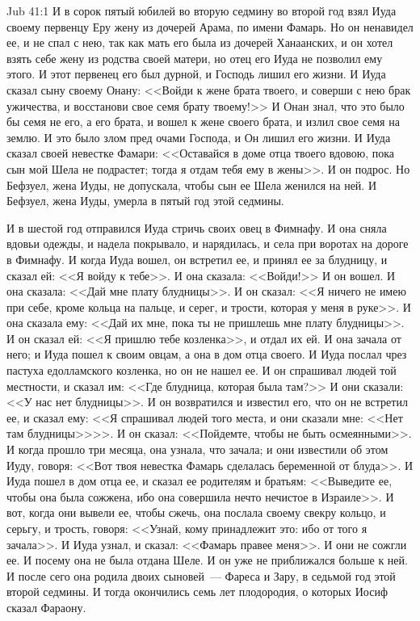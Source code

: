 \vs Jub 41:1
И в сорок пятый юбилей во вторую седмину во
второй год взял Иуда своему первенцу Еру жену из
дочерей Арама, по имени Фамарь. Но он ненавидел
ее, и не спал с нею, так как мать его была из
дочерей Ханаанских, и он хотел взять себе жену из
родства своей матери, но отец его Иуда не
позволил ему этого. И этот первенец его был
дурной, и Господь лишил его жизни. И Иуда сказал
сыну своему Онану: <<Войди к жене брата твоего, и
соверши с нею брак ужичества, и восстанови свое
семя брату твоему!>> И Онан знал, что это было бы
семя не его, а его брата, и вошел к жене своего
брата, и излил свое семя на землю. И это было злом
пред очами Господа, и Он лишил его жизни. И Иуда
сказал своей невестке Фамари: <<Оставайся в
доме отца твоего вдовою, пока сын мой Шела не
подрастет; тогда я отдам тебя ему в жены>>. И он
подрос. Но Бефзуел, жена Иуды, не допускала, чтобы
сын ее Шела женился на ней. И Бефзуел, жена Иуды,
умерла в пятый год этой седмины.

И в шестой год отправился Иуда стричь своих
овец в Фимнафу. И она сняла вдовьи одежды, и
надела покрывало, и нарядилась, и села при
воротах на дороге в Фимнафу. И когда Иуда вошел,
он встретил ее, и принял ее за блудницу, и сказал
ей: <<Я войду к тебе>>. И она сказала:
<<Войди!>> И он вошел. И она сказала: <<Дай мне
плату блудницы>>. И он сказал: <<Я ничего не
имею при себе, кроме кольца на пальце, и серег, и
трости, которая у меня в руке>>. И она сказала
ему: <<Дай их мне, пока ты не пришлешь мне плату
блудницы>>. И он сказал ей: <<Я пришлю тебе
козленка>>, и отдал их ей. И она зачала от него; и
Иуда пошел к своим овцам, а она в дом отца своего.
И Иуда послал чрез пастуха едолламского
козленка, но он не нашел ее. И он спрашивал людей той
местности, и сказал им: <<Где блудница,
которая была там?>> И они сказали: <<У нас
нет блудницы>>. И он возвратился и известил его,
что он не встретил ее, и сказал ему: <<Я
спрашивал людей того места, и они сказали мне:
<<Нет там блудницы>>>>. И он сказал:
<<Пойдемте, чтобы не быть осмеянными>>. И когда
прошло три месяца, она узнала, что зачала; и они
известили об этом Иуду, говоря: <<Вот твоя
невестка Фамарь сделалась беременной от
блуда>>. И Иуда пошел в дом отца ее, и сказал ее
родителям и братьям: <<Выведите ее, чтобы она
была сожжена, ибо она совершила нечто нечистое в
Израиле>>. И вот, когда они вывели ее, чтобы
сжечь, она послала своему свекру кольцо, и серьгу,
и трость, говоря: <<Узнай, кому принадлежит
это: ибо от того я зачала>>. И Иуда узнал, и
сказал: <<Фамарь правее меня>>. И они не сожгли
ее. И посему она не была отдана Шеле. И он уже не
приближался больше к ней. И после сего она родила
двоих сыновей~--- Фареса и Зару, в седьмой год этой
второй седмины. И тогда окончились семь лет
плодородия, о которых Иосиф сказал Фараону.

